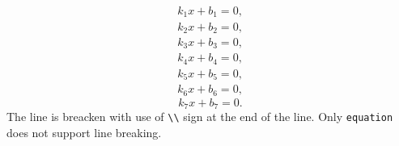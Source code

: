 \documentclass[fleqn]{article}
\begin{document}
\begin{align}
    k_1x+b_1=0, \\
    k_2x+b_2=0,
\end{align}
\begin{gather}
    k_3x+b_3=0, \\
    k_4x+b_4=0,
\end{gather}
\begin{multline}
    k_5x+b_5=0, \\
    k_6x+b_6=0,
\end{multline}
\begin{equation}
    k_7x+b_7=0.
\end{equation}
The line is breacken with use of \verb|\\| sign at the end of the line. Only \verb|equation| does not support line breaking. 
\end{document}

